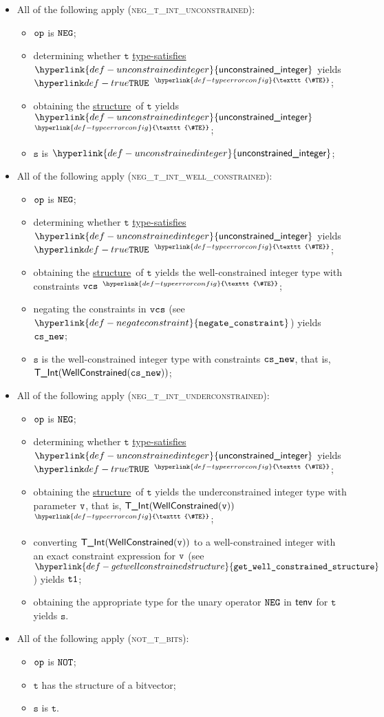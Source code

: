 \documentclass{book}
\newcommand\TypeErrorConfig[0]{\hyperlink{def-typeerrorconfig}{\texttt{\#TE}}}
\newcommand\ProseOrTypeError[0]{\hyperlink{def-proseortypeerror}{$^{\TypeErrorConfig}$}}
\newcommand\unconstrainedinteger[0]{\hyperlink{def-unconstrainedinteger}{\textsf{unconstrained\_integer}}}
\newcommand\negateconstraint[0]{\hyperlink{def-negateconstraint}{\texttt{negate\_constraint}}}
\newcommand\getwellconstrainedstructure[0]{\hyperlink{def-getwellconstrainedstructure}{\texttt{get\_well\_constrained\_structure}}}
\newcommand\structure[0]{\hyperlink{def-structure}{structure}}
\newcommand\typesatisfies[0]{\hyperlink{def-typesatisfies}{type-satisfies}}
\newcommand\vt[0]{\texttt{t}}
\newcommand\vs[0]{\texttt{s}}
\begin{document}
\begin{itemize}
\item All of the following apply (\textsc{neg\_t\_int\_unconstrained}):
\begin{itemize}
  \item $\texttt{op}$ is $\texttt{NEG}$;
  \item determining whether $\vt$ \typesatisfies\ $\unconstrainedinteger$ yields $\True$ \ProseOrTypeError;
  \item obtaining the \structure\ of $\vt$ yields $\unconstrainedinteger$ \ProseOrTypeError;
  \item $\vs$ is $\unconstrainedinteger$;
\end{itemize}

\item All of the following apply (\textsc{neg\_t\_int\_well\_constrained}):
\begin{itemize}
  \item $\texttt{op}$ is $\texttt{NEG}$;
  \item determining whether $\vt$ \typesatisfies\ $\unconstrainedinteger$ yields $\True$ \ProseOrTypeError;
  \item obtaining the \structure\ of $\vt$ yields the well-constrained integer type with constraints $\texttt{vcs}$ \ProseOrTypeError;
  \item negating the constraints in $\texttt{vcs}$ (see $\negateconstraint$) yields $\texttt{cs\_new}$;
  \item $\vs$ is the well-constrained integer type with constraints $\texttt{cs\_new}$, that is, \\
  $\textsf{T\_Int}(\textsf{WellConstrained}(\texttt{cs\_new}))$;
\end{itemize}

\item All of the following apply (\textsc{neg\_t\_int\_underconstrained}):
\begin{itemize}
  \item $\texttt{op}$ is $\texttt{NEG}$;
  \item determining whether $\vt$ \typesatisfies\ $\unconstrainedinteger$ yields $\True$ \ProseOrTypeError;
  \item obtaining the \structure\ of $\vt$ yields the underconstrained integer type with parameter $\texttt{v}$, that is,
  $\textsf{T\_Int}(\textsf{WellConstrained}(\texttt{v}))$ \ProseOrTypeError;
  \item converting $\textsf{T\_Int}(\textsf{WellConstrained}(\texttt{v}))$ to a well-constrained integer with an exact constraint expression for $\texttt{v}$
  (see $\getwellconstrainedstructure$) yields $\texttt{t1}$;
  \item obtaining the appropriate type for the unary operator $\texttt{NEG}$ in $\textsf{tenv}$ for $\vt$ yields $\vs$.
\end{itemize}

\item All of the following apply (\textsc{not\_t\_bits}):
  \begin{itemize}
  \item $\texttt{op}$ is $\texttt{NOT}$;
  \item $\vt$ has the structure of a bitvector;
  \item $\vs$ is $\vt$.
  \end{itemize}
\end{itemize}
\end{document}
